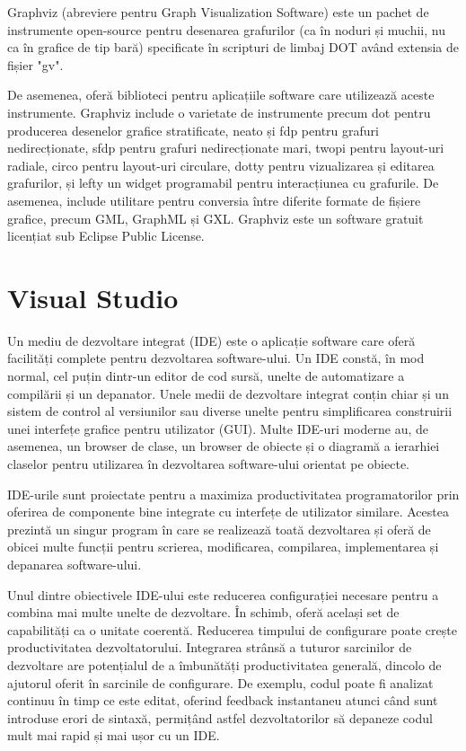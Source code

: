 \documentclass[a4paper,12pt]{report}
\begin{document}
Graphviz (abreviere pentru Graph Visualization Software) este un pachet de instrumente open-source pentru desenarea grafurilor (ca în noduri și muchii, nu ca în grafice de tip bară) specificate în scripturi de limbaj DOT având extensia de fișier "gv".

De asemenea, oferă biblioteci pentru aplicațiile software care utilizează aceste instrumente. Graphviz include o varietate de instrumente precum dot pentru producerea desenelor grafice stratificate, neato și fdp pentru grafuri nedirecționate, sfdp pentru grafuri nedirecționate mari, twopi pentru layout-uri radiale, circo pentru layout-uri circulare, dotty pentru vizualizarea și editarea grafurilor, și lefty un widget programabil pentru interacțiunea cu grafurile. De asemenea, include utilitare pentru conversia între diferite formate de fișiere grafice, precum GML, GraphML și GXL. Graphviz este un software gratuit licențiat sub Eclipse Public License.

\section{Visual Studio}
Un mediu de dezvoltare integrat (IDE) este o aplicație software care oferă facilități complete pentru dezvoltarea software-ului. Un IDE constă, în mod normal, cel puțin dintr-un editor de cod sursă, unelte de automatizare a compilării și un depanator. Unele medii de dezvoltare integrat conțin chiar și un sistem de control al versiunilor sau diverse unelte pentru simplificarea construirii unei interfețe grafice pentru utilizator (GUI). Multe IDE-uri moderne au, de asemenea, un browser de clase, un browser de obiecte și o diagramă a ierarhiei claselor pentru utilizarea în dezvoltarea software-ului orientat pe obiecte.

IDE-urile sunt proiectate pentru a maximiza productivitatea programatorilor prin oferirea de componente bine integrate cu interfețe de utilizator similare. Acestea prezintă un singur program în care se realizează toată dezvoltarea și oferă de obicei multe funcții pentru scrierea, modificarea, compilarea, implementarea și depanarea software-ului.

Unul dintre obiectivele IDE-ului este reducerea configurației necesare pentru a combina mai multe unelte de dezvoltare. În schimb, oferă același set de capabilități ca o unitate coerentă. Reducerea timpului de configurare poate crește productivitatea dezvoltatorului. Integrarea strânsă a tuturor sarcinilor de dezvoltare are potențialul de a îmbunătăți productivitatea generală, dincolo de ajutorul oferit în sarcinile de configurare. De exemplu, codul poate fi analizat continuu în timp ce este editat, oferind feedback instantaneu atunci când sunt introduse erori de sintaxă, permițând astfel dezvoltatorilor să depaneze codul mult mai rapid și mai ușor cu un IDE.
\end{document}

